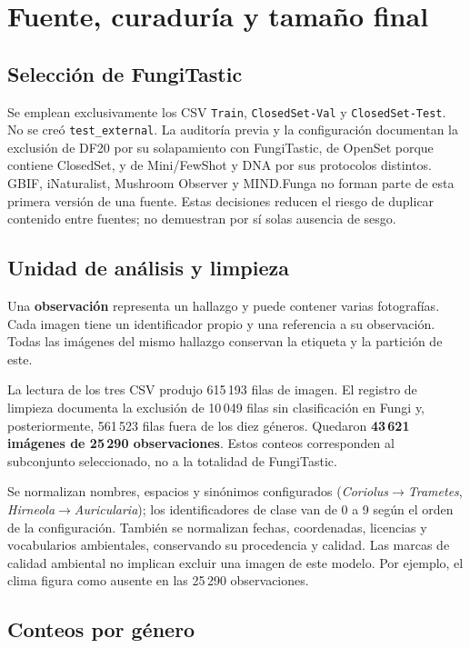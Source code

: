 \documentclass[11pt,a4paper]{article}
\newcommand{\archivo}[1]{\nolinkurl{#1}}
\begin{document}
\section{Fuente, curaduría y tamaño final}

\subsection{Selección de FungiTastic}

Se emplean exclusivamente los CSV \archivo{Train}, \archivo{ClosedSet-Val}
y \archivo{ClosedSet-Test}. No se creó \archivo{test_external}.
La auditoría previa y la configuración documentan la exclusión de DF20 por su
solapamiento con FungiTastic, de OpenSet porque contiene ClosedSet, y de
Mini/FewShot y DNA por sus protocolos distintos. GBIF, iNaturalist,
Mushroom Observer y MIND.Funga no forman parte de esta primera versión de una fuente.
Estas decisiones reducen el riesgo de duplicar contenido entre fuentes; no demuestran
por sí solas ausencia de sesgo.

\subsection{Unidad de análisis y limpieza}

Una \textbf{observación} representa un hallazgo y puede contener varias fotografías.
Cada imagen tiene un identificador propio y una referencia a su observación.
Todas las imágenes del mismo hallazgo conservan la etiqueta y la partición de este.

La lectura de los tres CSV produjo 615\,193 filas de imagen. El registro de limpieza
documenta la exclusión de 10\,049 filas sin clasificación en Fungi y, posteriormente,
561\,523 filas fuera de los diez géneros. Quedaron \textbf{43\,621 imágenes de
25\,290 observaciones}. Estos conteos corresponden al subconjunto seleccionado,
no a la totalidad de FungiTastic.

Se normalizan nombres, espacios y sinónimos configurados
(\textit{Coriolus}\(\rightarrow\)\textit{Trametes},
\textit{Hirneola}\(\rightarrow\)\textit{Auricularia}); los identificadores de
clase van de 0 a 9 según el orden de la configuración. También se normalizan
fechas, coordenadas, licencias y vocabularios ambientales, conservando su procedencia
y calidad. Las marcas de calidad ambiental no implican excluir una imagen de este
modelo. Por ejemplo, el clima figura como ausente en las 25\,290 observaciones.

\subsection{Conteos por género}
\end{document}
